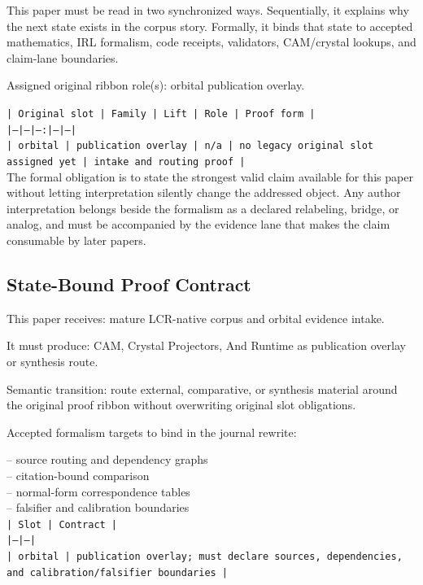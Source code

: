 \documentclass[11pt]{article}
\begin{document}
This paper must be read in two synchronized ways. Sequentially, it explains why
the next state exists in the corpus story. Formally, it binds that state to
accepted mathematics, IRL formalism, code receipts, validators, CAM/crystal
lookups, and claim-lane boundaries.

Assigned original ribbon role(s): orbital publication overlay.

\noindent\texttt{| Original slot | Family | Lift | Role | Proof form |}\\
\noindent\texttt{|---|---|---:|---|---|}\\
\noindent\texttt{| orbital | publication overlay | n/a | no legacy original slot assigned yet | intake and routing proof |}\\

The formal obligation is to state the strongest valid claim available for this
paper without letting interpretation silently change the addressed object. Any
author interpretation belongs beside the formalism as a declared relabeling,
bridge, or analog, and must be accompanied by the evidence lane that makes the
claim consumable by later papers.

\subsection*{State-Bound Proof Contract}

This paper receives: mature LCR-native corpus and orbital evidence intake.

It must produce: CAM, Crystal Projectors, And Runtime as publication overlay or synthesis route.

Semantic transition: route external, comparative, or synthesis material around the original proof ribbon without overwriting original slot obligations.

Accepted formalism targets to bind in the journal rewrite:

\noindent{}-- source routing and dependency graphs\\
\noindent{}-- citation-bound comparison\\
\noindent{}-- normal-form correspondence tables\\
\noindent{}-- falsifier and calibration boundaries\\

\noindent\texttt{| Slot | Contract |}\\
\noindent\texttt{|---|---|}\\
\noindent\texttt{| orbital | publication overlay; must declare sources, dependencies, and calibration/falsifier boundaries |}\\
\end{document}
